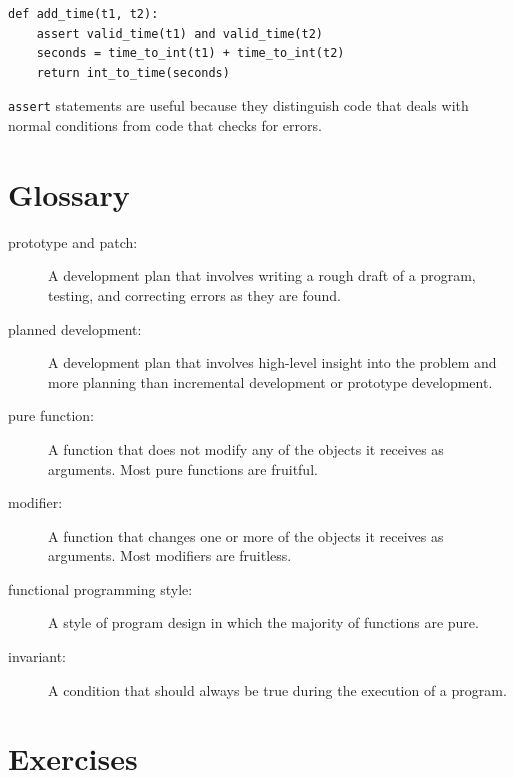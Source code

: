 \documentclass[10pt]{book}
\begin{document}

\beforeverb
\begin{verbatim}
def add_time(t1, t2):
    assert valid_time(t1) and valid_time(t2)
    seconds = time_to_int(t1) + time_to_int(t2)
    return int_to_time(seconds)
\end{verbatim}
\afterverb
%
{\tt assert} statements are useful because they distinguish
code that deals with normal conditions from code
that checks for errors.


\section{Glossary}

\begin{description}

\item[prototype and patch:] A development plan that involves
writing a rough draft of a program, testing, and correcting errors as
they are found.

\item[planned development:] A development plan that involves
high-level insight into the problem and more planning than incremental
development or prototype development.

\item[pure function:] A function that does not modify any of the objects it
receives as arguments.  Most pure functions are fruitful.

\item[modifier:] A function that changes one or more of the objects it
receives as arguments.  Most modifiers are fruitless.

\item[functional programming style:] A style of program design in which the
majority of functions are pure.

\item[invariant:] A condition that should always be true during the
execution of a program.

\end{description}


\section{Exercises}
\end{document}
